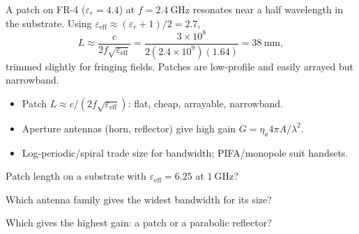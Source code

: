 \begin{workedexample}
A patch on FR-4 ($\varepsilon_r = 4.4$) at $f = 2.4\ \text{GHz}$ resonates
near a half wavelength in the substrate. Using
$\varepsilon_{\text{eff}} \approx (\varepsilon_r+1)/2 = 2.7$,
\[ L \approx \frac{c}{2f\sqrt{\varepsilon_{\text{eff}}}}
   = \frac{3\times10^{8}}{2(2.4\times10^{9})(1.64)} = 38\ \text{mm}, \]
trimmed slightly for fringing fields. Patches are low-profile and easily arrayed
but narrowband.
\end{workedexample}

\begin{keytakeaways}
\begin{itemize}[leftmargin=1.4em,itemsep=2pt]
\item Patch $L \approx c/(2f\sqrt{\varepsilon_{\text{eff}}})$: flat, cheap, arrayable, narrowband.
\item Aperture antennas (horn, reflector) give high gain $G = \eta_a 4\pi A/\lambda^2$.
\item Log-periodic/spiral trade size for bandwidth; PIFA/monopole suit handsets.
\end{itemize}
\end{keytakeaways}

\begin{exercises}
\item Patch length on a substrate with $\varepsilon_{\text{eff}} = 6.25$ at $1\ \text{GHz}$?
\item Which antenna family gives the widest bandwidth for its size?
\item Which gives the highest gain: a patch or a parabolic reflector?
\end{exercises}

